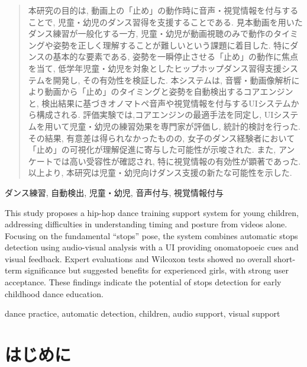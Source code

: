 \documentclass[technicalreport]{ieicej}
\begin{document}
\begin{abstract}
    本研究の目的は, 動画上の「止め」の動作時に音声・視覚情報を付与することで, 児童・幼児のダンス習得を支援することである. 見本動画を用いたダンス練習が一般化する一方, 児童・幼児が動画視聴のみで動作のタイミングや姿勢を正しく理解することが難しいという課題に着目した. 特にダンスの基本的な要素である, 姿勢を一瞬停止させる「止め」の動作に焦点を当て, 低学年児童・幼児を対象としたヒップホップダンス習得支援システムを開発し, その有効性を検証した. 本システムは, 音響・動画像解析により動画から「止め」のタイミングと姿勢を自動検出するコアエンジンと, 検出結果に基づきオノマトペ音声や視覚情報を付与するUIシステムから構成される. 評価実験では,コアエンジンの最適手法を同定し, UIシステムを用いて児童・幼児の練習効果を専門家が評価し, 統計的検討を行った. その結果, 有意差は得られなかったものの, 女子のダンス経験者において「止め」の可視化が理解促進に寄与した可能性が示唆された. また, アンケートでは高い受容性が確認され, 特に視覚情報の有効性が顕著であった. 以上より, 本研究は児童・幼児向けダンス支援の新たな可能性を示した. 
\end{abstract}
\begin{keyword}
    ダンス練習, 自動検出, 児童・幼児, 音声付与, 視覚情報付与
\end{keyword}
\begin{eabstract}
    This study proposes a hip-hop dance training support system for young children, addressing difficulties in understanding timing and posture from videos alone. Focusing on the fundamental “stops” pose, the system combines automatic stops detection using audio-visual analysis with a UI providing onomatopoeic cues and visual feedback. Expert evaluations and Wilcoxon tests showed no overall short-term significance but suggested benefits for experienced girls, with strong user acceptance. These findings indicate the potential of stops detection for early childhood dance education.
\end{eabstract}
\begin{ekeyword}
    dance practice, automatic detection, children, audio support, visual support
\end{ekeyword}
\maketitle

\section{はじめに}
\end{document}
